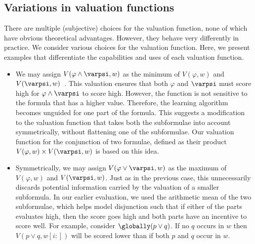 \subsection{Variations in valuation functions}
\label{sec:vari}
There are multiple (subjective) choices for the
valuation function, none of which have obvious theoretical advantages.
However, they behave very differently in practice.
We consider various choices for the valuation function.
Here, we present
examples that differentiate the capabilities and uses of each valuation function.
\begin{itemize}
\item 
  We may assign $V(\varphi \land \varpsi, w)$ as the minimum of $V(\varphi, w)$
  and $V(\varpsi, w)$~\cite{tabuada2015robust}. This valuation ensures that both
  $\varphi$ and $\varpsi$ must score high for $\varphi \land \varpsi$ to score
  high. However, the function is not sensitive to the formula that has a higher
  value. Therefore, the learning algorithm becomes unguided for one part of the
  formula. This suggests a modification to the valuation function that takes
  both the subformulae into account symmetrically, without flattening one of the
  subformulae. Our valuation function for the conjunction of two formulae,
  defined as their product $V(\varphi, w) \times V(\varpsi, w)$ is based on this
  idea.
  


\item Symmetrically, we may assign $V(\varphi \lor \varpsi, w)$ as the 
  maximum of $V(\varphi, w)$ and $V(\varpsi, w)$.
  Just as  in the previous case, this unnecessarily discards potential information carried by the valuation   of a smaller subformula.
  In our earlier evaluation, we used the arithmetic mean of the two subformulae,
  which helps model disjunction such that if either of the parts evaluates high,  
  then the score goes high and both parts have an incentive to score well.
  For example, consider $\globally (p \lor q)$. If no $q$ occurs in $w$ then
  $V(p\lor q, w[i:])$ will be scored lower than if both $p$ and $q$ occur in $w$.
   

\end{itemize}

